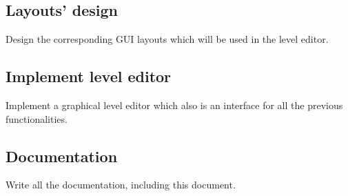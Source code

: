 \documentclass{report}
\theoremstyle{plain}
\begin{document}
\subsection{Layouts' design}
Design the corresponding GUI layouts which will be used in the level editor. 

\subsection{Implement level editor}
Implement a graphical level editor which also is an interface for all the previous functionalities.

\subsection{Documentation}
Write all the documentation, including this document.
\end{document}
